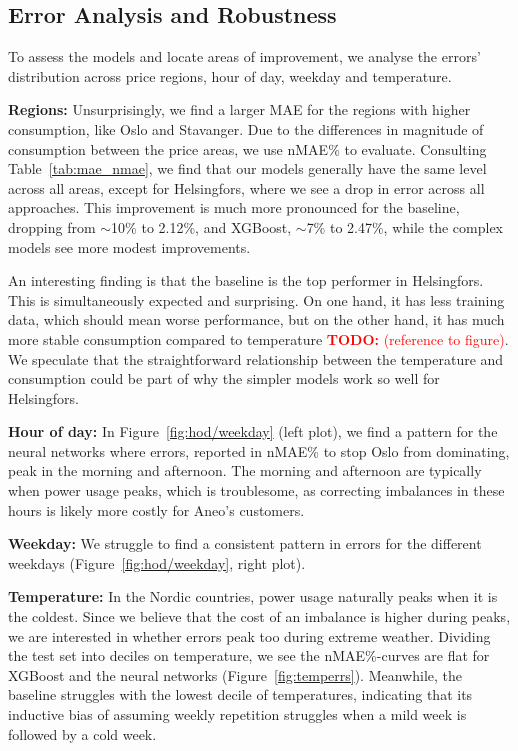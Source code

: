 \documentclass[11pt,a4paper]{article}
\newcommand{\todo}[1]{\textcolor{red}{\textbf{TODO:} #1}}
\begin{document}
\subsection{Error Analysis and Robustness}
To assess the models and locate areas of improvement, we analyse the errors' distribution across price regions, hour of day, weekday and temperature.

\textbf{Regions:} Unsurprisingly, we find a larger MAE for the regions with higher consumption, like Oslo and Stavanger. Due to the differences in magnitude of consumption between the price areas, we use nMAE\% to evaluate. Consulting Table~\ref{tab:mae_nmae}, we find that our models generally have the same level across all areas, except for Helsingfors, where we see a drop in error across all approaches. This improvement is much more pronounced for the baseline, dropping from $\sim$10\% to 2.12\%, and XGBoost, $\sim$7\% to 2.47\%, while the complex models see more modest improvements. 

An interesting finding is that the baseline is the top performer in Helsingfors. This is simultaneously expected and surprising. On one hand, it has less training data, which should mean worse performance, but on the other hand, it has much more stable consumption compared to temperature \todo{(reference to figure)}. We speculate that the straightforward relationship between the temperature and consumption could be part of why the simpler models work so well for Helsingfors.

\textbf{Hour of day:} In Figure~\ref{fig:hod/weekday} (left plot), we find a pattern for the neural networks where errors, reported in nMAE\% to stop Oslo from dominating, peak in the morning and afternoon. The morning and afternoon are typically when power usage peaks, which is troublesome, as correcting imbalances in these hours is likely more costly for Aneo's customers.

\textbf{Weekday:} We struggle to find a consistent pattern in errors for the different weekdays (Figure~\ref{fig:hod/weekday}, right plot).

\textbf{Temperature:} In the Nordic countries, power usage naturally peaks when it is the coldest. Since we believe that the cost of an imbalance is higher during peaks, we are interested in whether errors peak too during extreme weather. Dividing the test set into deciles on temperature, we see the nMAE\%-curves are flat for XGBoost and the neural networks (Figure~\ref{fig:temperrs}). Meanwhile, the baseline struggles with the lowest decile of temperatures, indicating that its inductive bias of assuming weekly repetition struggles when a mild week is followed by a cold week.
\end{document}
